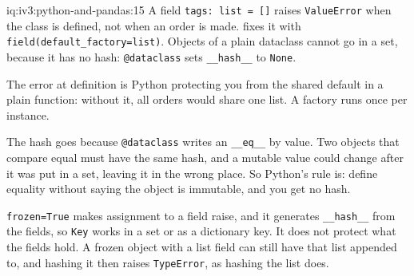 \begin{solution}{iq:iv3:python-and-pandas:15}
A field \texttt{tags: list = []} raises \texttt{ValueError} when the class is defined, not when an order is made.  fixes it with \texttt{field(default\_factory=list)}. Objects of a plain dataclass cannot go in a set, because it has no hash: \texttt{@dataclass} sets \texttt{\_\_hash\_\_} to \texttt{None}.
\label{lst:iv3:pp:dataclass}

The error at definition is Python protecting you from the shared default in a plain function: without it, all orders would share one list. A factory runs once per instance.

The hash goes because \texttt{@dataclass} writes an \texttt{\_\_eq\_\_} by value. Two objects that compare equal must have the same hash, and a mutable value could change after it was put in a set, leaving it in the wrong place. So Python's rule is: define equality without saying the object is immutable, and you get no hash.

\texttt{frozen=True} makes assignment to a field raise, and it generates \texttt{\_\_hash\_\_} from the fields, so \texttt{Key} works in a set or as a dictionary key. It does not protect what the fields hold. A frozen object with a list field can still have that list appended to, and hashing it then raises \texttt{TypeError}, as hashing the list does.

\end{solution}


